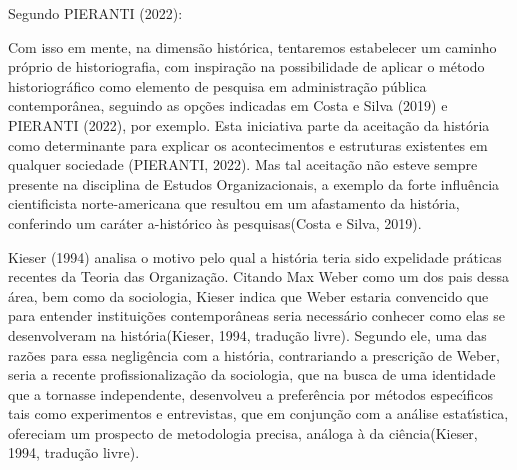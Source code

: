 \documentclass[
12pt,		%
openright,	%
twoside,  %
a4paper,			%
chapter=TITLE,		%
english,			%
french,				%
spanish,			%
brazil				%
]{USPSC-classe/USPSC}
\begin{document}
Segundo PIERANTI (2022):











\noindent\begin{center}\mbox{\centering{}}\end{center}


Com isso em mente, na dimens\~ao hist\'orica, tentaremos estabelecer um caminho pr\'oprio de historiografia, com inspira\c{c}\~ao na possibilidade de aplicar o m\'etodo historiogr\'afico como elemento de pesquisa em administra\c{c}\~ao p\'ublica contempor\^anea, seguindo as op\c{c}\~oes indicadas em   Costa e Silva (2019) e PIERANTI (2022), por exemplo. Esta iniciativa parte da aceita\c{c}\~ao da hist\'oria como determinante para explicar os acontecimentos e estruturas existentes em qualquer sociedade (PIERANTI, 2022). Mas tal aceita\c{c}\~ao n\~ao esteve sempre presente na disciplina de Estudos Organizacionais, a exemplo da \textquotedbl forte influ\^encia cientificista norte-americana que resultou em um afastamento da hist\'oria, conferindo um car\'ater a-hist\'orico \`as pesquisas\textquotedbl   (Costa e Silva, 2019).










 Kieser (1994)  analisa o motivo pelo qual a hist\'oria teria sido \textquotedbl expelida\textquotedbl  de pr\'aticas recentes da Teoria das Organiza\c{c}\~ao. Citando Max Weber como um dos pais dessa \'area, bem como da sociologia, Kieser indica que Weber estaria \textquotedbl convencido que para entender institui\c{c}\~oes contempor\^aneas seria necess\'ario conhecer como elas se desenvolveram na hist\'oria\textquotedbl   (Kieser, 1994, tradu\c{c}\~ao livre). Segundo ele, uma das raz\~oes para essa neglig\^encia com a hist\'oria, contrariando a prescri\c{c}\~ao de Weber, seria a recente profissionaliza\c{c}\~ao da sociologia, que na busca de uma identidade que a tornasse independente, desenvolveu a prefer\^encia por m\'etodos espec\'{\i}ficos tais como experimentos e entrevistas, que \textquotedbl em conjun\c{c}\~ao com a an\'alise estat\'{\i}stica, ofereciam um prospecto de metodologia precisa, an\'aloga \`a da ci\^encia\textquotedbl   (Kieser, 1994, tradu\c{c}\~ao livre).
\end{document}
